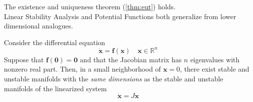The existence and uniqueness theorem (\ref{thm:eut}) holds.\\
Linear Stability Analysis and Potential Functions both generalize from lower dimensional analogues.
\begin{theorem}
	Consider the differential equation
	\begin{equation*}
		\mathbf{\dot{x}}=\mathbf{f}(\mathbf{x})\quad\mathbf{x}\in\mathbb{R}^n
	\end{equation*}
	Suppose that $\mathbf{f}(\mathbf{0})=\mathbf{0}$ and that the Jacobian matrix has $n$ eigenvalues with nonzero real part.
	Then, in a small neighborhood of $\mathbf{x}=0$, there exist stable and unstable manifolds with the \emph{same dimensions} as the stable and unstable manifolds of the linearized system
	\begin{equation*}
		\mathbf{\dot{x}}=J\mathbf{x}
	\end{equation*}
\end{theorem}